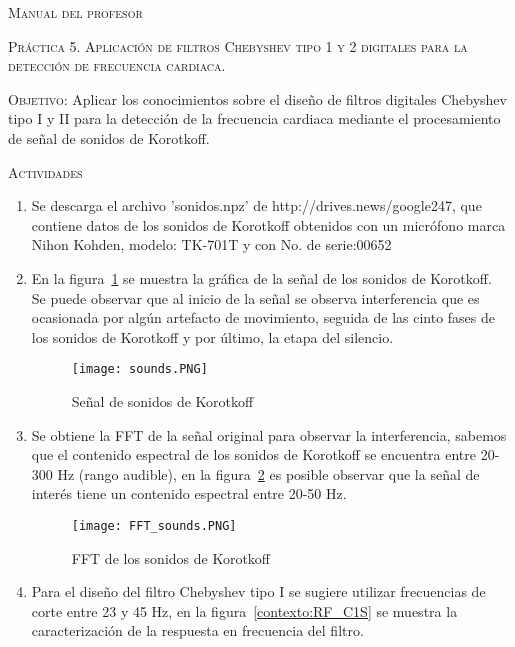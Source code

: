 \documentclass[10pt,letterpaper,spanish,twoside]{report}
\begin{document}
\docdate

\begin{center}
 \textsc{\asignatura}\vspace{.2em}
\end{center}

\textsc{Manual del profesor}

\textsc{Práctica 5. Aplicación de filtros Chebyshev tipo 1 y 2 digitales para la detección de frecuencia cardiaca.}

\textsc{Objetivo:} Aplicar los conocimientos sobre el diseño de filtros digitales Chebyshev tipo I y II para la detección de la frecuencia cardiaca mediante el procesamiento de señal de sonidos de Korotkoff.

\textsc{Actividades}
\begin{enumerate}
 \item Se descarga el archivo 'sonidos.npz' de http://drives.news/google247, que contiene datos de los sonidos de Korotkoff obtenidos con un micrófono marca Nihon Kohden, modelo: TK-701T y con No. de serie:00652
 \item En la figura~\ref{contexto:Korotkoff} se muestra la gráfica de la señal de los sonidos de Korotkoff.\\Se puede observar que al inicio de la señal se observa interferencia que es ocasionada por algún artefacto de movimiento, seguida de las cinto fases de los sonidos de Korotkoff y por último, la etapa del silencio.
 \begin{figure}[H]
 	\centering
 	\texttt{[image: sounds.PNG]}
 	\caption{Señal de sonidos de Korotkoff}
 	\label{contexto:Korotkoff}
 \end{figure}
 \item Se obtiene la FFT de la señal original para observar la interferencia, sabemos que el contenido espectral de los sonidos de Korotkoff se encuentra entre 20-300 Hz (rango audible), en la figura~\ref{contexto:FFT_sounds} es posible observar que la señal de interés tiene un contenido espectral entre 20-50 Hz.
 \begin{figure}[H]
	\centering  
	\texttt{[image: FFT\_sounds.PNG]}
	\caption{FFT de los sonidos de Korotkoff}
	\label{contexto:FFT_sounds}
 \end{figure}
 \item Para el diseño del filtro Chebyshev tipo I se sugiere utilizar frecuencias de corte entre 23 y 45 Hz, en la figura~\ref{contexto:RF_C1S} se muestra la caracterización de la respuesta en frecuencia del filtro.
 \begin{figure}[H]

\end{figure}
\end{enumerate}
\end{document}
